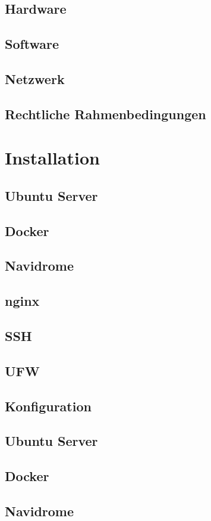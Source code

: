 \documentclass[12pt,a4paper]{report}
\begin{document}
  \subsection{Hardware}
  \subsection{Software}
  \subsection{Netzwerk}
  \subsection{Rechtliche Rahmenbedingungen}
\section{Installation}
  \subsection{Ubuntu Server}
  \subsection{Docker}
  \subsection{Navidrome}
  \subsection{nginx}
  \subsection{SSH}
  \subsection{UFW}
\subsection{Konfiguration}
  \subsection{Ubuntu Server}
  \subsection{Docker}
  \subsection{Navidrome}
\end{document}
